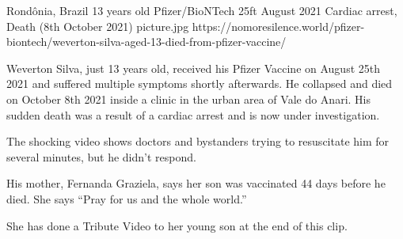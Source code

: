 {Rondônia, Brazil}
{13 years old}
{Pfizer/BioNTech}
{25ft August 2021}
{Cardiac arrest, Death (8th October 2021)}
{picture.jpg}
{https://nomoresilence.world/pfizer-biontech/weverton-silva-aged-13-died-from-pfizer-vaccine/}
{

Weverton Silva, just 13 years old, received his Pfizer Vaccine on August 25th
2021 and suffered multiple symptoms shortly afterwards. He collapsed and died on
October 8th 2021 inside a clinic in the urban area of Vale do Anari. His sudden
death was a result of a cardiac arrest and is now under investigation.

The shocking video shows doctors and bystanders trying to resuscitate him for
several minutes, but he didn’t respond.

His mother, Fernanda Graziela, says her son was vaccinated 44 days before he
died. She says “Pray for us and the whole world.”

She has done a Tribute Video to her young son at the end of this clip.

}
